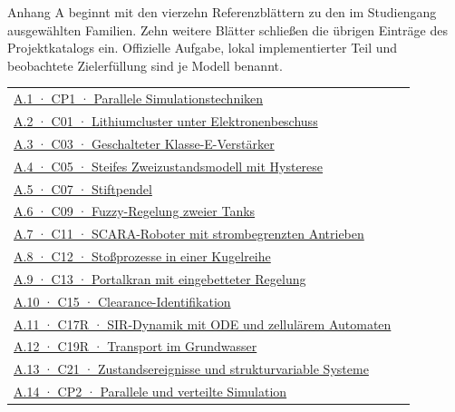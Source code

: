 Anhang A beginnt mit den vierzehn Referenzblättern zu den im Studiengang ausgewählten Familien. Zehn weitere Blätter schließen die übrigen Einträge des Projektkatalogs ein. Offizielle Aufgabe, lokal implementierter Teil und beobachtete Zielerfüllung sind je Modell benannt.
{\tblstart\begin{tabularx}{\linewidth}{@{}Yr@{}}\toprule
\hyperlink{refCP1}{A.1 · CP1 · Parallele Simulationstechniken} & \\[2pt]
\hyperlink{refC01}{A.2 · C01 · Lithiumcluster unter Elektronenbeschuss} & \\[2pt]
\hyperlink{refC03}{A.3 · C03 · Geschalteter Klasse-E-Verstärker} & \\[2pt]
\hyperlink{refC05}{A.4 · C05 · Steifes Zweizustandsmodell mit Hysterese} & \\[2pt]
\hyperlink{refC07}{A.5 · C07 · Stiftpendel} & \\[2pt]
\hyperlink{refC09}{A.6 · C09 · Fuzzy-Regelung zweier Tanks} & \\[2pt]
\hyperlink{refC11}{A.7 · C11 · SCARA-Roboter mit strombegrenzten Antrieben} & \\[2pt]
\hyperlink{refC12}{A.8 · C12 · Stoßprozesse in einer Kugelreihe} & \\[2pt]
\hyperlink{refC13}{A.9 · C13 · Portalkran mit eingebetteter Regelung} & \\[2pt]
\hyperlink{refC15}{A.10 · C15 · Clearance-Identifikation} & \\[2pt]
\hyperlink{refC17R}{A.11 · C17R · SIR-Dynamik mit ODE und zellulärem Automaten} & \\[2pt]
\hyperlink{refC19R}{A.12 · C19R · Transport im Grundwasser} & \\[2pt]
\hyperlink{refC21}{A.13 · C21 · Zustandsereignisse und strukturvariable Systeme} & \\[2pt]
\hyperlink{refCP2}{A.14 · CP2 · Parallele und verteilte Simulation} & \\[2pt]
\bottomrule\end{tabularx}\par}
